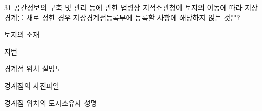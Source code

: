 \begin{question}{31}
공간정보의 구축 및 관리 등에 관한 법령상 지적소관청이 토지의 이동에 따라 지상경계를 새로 정한 경우 지상경계점등록부에 등록할 사항에 해당하지 않는 것은?
\begin{choices}
  \item 토지의 소재
  \item 지번
  \item 경계점 위치 설명도
  \item 경계점의 사진파일
  \item 경계점 위치의 토지소유자 성명
\end{choices}
\end{question}

